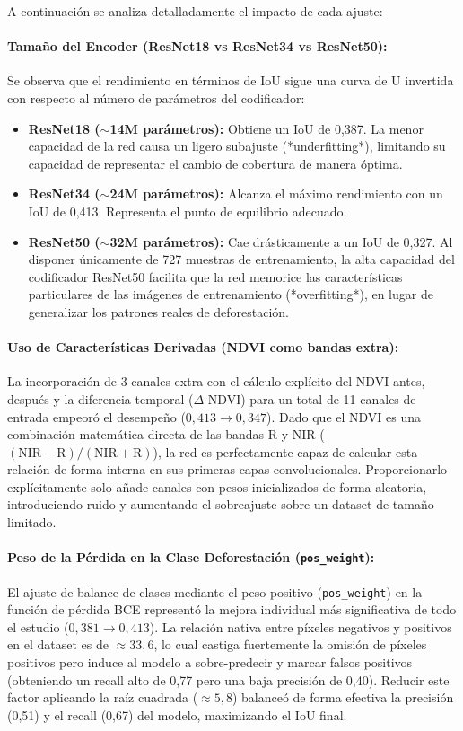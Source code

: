 \documentclass{article}
\begin{document}
A continuación se analiza detalladamente el impacto de cada ajuste:

\paragraph{Tamaño del Encoder (ResNet18 vs ResNet34 vs ResNet50):}
Se observa que el rendimiento en términos de IoU sigue una curva de U invertida con respecto al número de parámetros del codificador:
\begin{itemize}
    \item \textbf{ResNet18 ($\sim$14M parámetros):} Obtiene un IoU de 0,387. La menor capacidad de la red causa un ligero subajuste (*underfitting*), limitando su capacidad de representar el cambio de cobertura de manera óptima.
    \item \textbf{ResNet34 ($\sim$24M parámetros):} Alcanza el máximo rendimiento con un IoU de 0,413. Representa el punto de equilibrio adecuado.
    \item \textbf{ResNet50 ($\sim$32M parámetros):} Cae drásticamente a un IoU de 0,327. Al disponer únicamente de 727 muestras de entrenamiento, la alta capacidad del codificador ResNet50 facilita que la red memorice las características particulares de las imágenes de entrenamiento (*overfitting*), en lugar de generalizar los patrones reales de deforestación.
\end{itemize}

\paragraph{Uso de Características Derivadas (NDVI como bandas extra):}
La incorporación de 3 canales extra con el cálculo explícito del NDVI antes, después y la diferencia temporal ($\Delta$-NDVI) para un total de 11 canales de entrada empeoró el desempeño ($0,413 \to 0,347$). Dado que el NDVI es una combinación matemática directa de las bandas R y NIR ($(\text{NIR}-\text{R})/(\text{NIR}+\text{R})$), la red es perfectamente capaz de calcular esta relación de forma interna en sus primeras capas convolucionales. Proporcionarlo explícitamente solo añade canales con pesos inicializados de forma aleatoria, introduciendo ruido y aumentando el sobreajuste sobre un dataset de tamaño limitado.

\paragraph{Peso de la Pérdida en la Clase Deforestación (\texttt{pos\_weight}):}
El ajuste de balance de clases mediante el peso positivo (\texttt{pos\_weight}) en la función de pérdida BCE representó la mejora individual más significativa de todo el estudio ($0,381 \to 0,413$). La relación nativa entre píxeles negativos y positivos en el dataset es de $\approx 33{,}6$, lo cual castiga fuertemente la omisión de píxeles positivos pero induce al modelo a sobre-predecir y marcar falsos positivos (obteniendo un recall alto de 0,77 pero una baja precisión de 0,40). Reducir este factor aplicando la raíz cuadrada ($\approx 5{,}8$) balanceó de forma efectiva la precisión (0,51) y el recall (0,67) del modelo, maximizando el IoU final.
\end{document}
